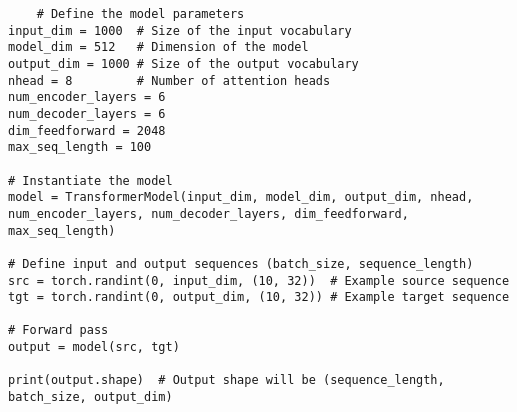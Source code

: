 \documentclass{article}
\begin{document}
\begin{lstlisting}
    # Define the model parameters
input_dim = 1000  # Size of the input vocabulary
model_dim = 512   # Dimension of the model
output_dim = 1000 # Size of the output vocabulary
nhead = 8         # Number of attention heads
num_encoder_layers = 6
num_decoder_layers = 6
dim_feedforward = 2048
max_seq_length = 100

# Instantiate the model
model = TransformerModel(input_dim, model_dim, output_dim, nhead, num_encoder_layers, num_decoder_layers, dim_feedforward, max_seq_length)

# Define input and output sequences (batch_size, sequence_length)
src = torch.randint(0, input_dim, (10, 32))  # Example source sequence
tgt = torch.randint(0, output_dim, (10, 32)) # Example target sequence

# Forward pass
output = model(src, tgt)

print(output.shape)  # Output shape will be (sequence_length, batch_size, output_dim)
\end{lstlisting}
\end{document}
